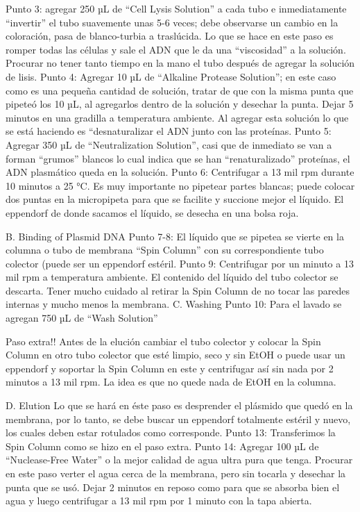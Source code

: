 \begin{appendix}
\begin{itemize}
Punto 3: agregar 250 µL de “Cell Lysis Solution” a cada tubo e inmediatamente “invertir” el tubo suavemente unas 5-6 veces; debe observarse un cambio en la coloración, pasa de blanco-turbia a traslúcida. Lo que se hace en este paso es romper todas las células y sale el ADN que le da una “viscosidad” a la solución. Procurar no tener tanto tiempo en la mano el tubo después de agregar la solución de lisis.
Punto 4: Agregar 10 µL de “Alkaline Protease Solution”; en este caso como es una pequeña cantidad de solución, tratar de que con la misma punta que pipeteó los 10 µL, al agregarlos dentro de la solución y desechar la punta. Dejar 5 minutos en una gradilla a temperatura ambiente. Al agregar esta solución lo que se está haciendo es “desnaturalizar el ADN junto con las proteínas.
Punto 5: Agregar 350 µL de “Neutralization Solution”, casi que de inmediato se van a forman “grumos” blancos lo cual indica que se han “renaturalizado” proteínas, el ADN plasmático queda en la solución. 
Punto 6: Centrifugar a 13 mil rpm durante 10 minutos a 25 °C. 
Es muy importante no pipetear partes blancas; puede colocar dos puntas en la micropipeta para que se facilite y succione mejor el líquido. El eppendorf de donde sacamos el líquido, se desecha en una bolsa roja. 

    B. Binding of Plasmid DNA
Punto 7-8: El líquido que se pipetea se vierte en la columna o tubo de membrana “Spin Column” con su correspondiente tubo colector (puede ser un eppendorf estéril.
Punto 9: Centrifugar por un minuto a 13 mil rpm a temperatura ambiente. El contenido del líquido del tubo colector se descarta. Tener mucho cuidado al retirar la Spin Column de no tocar las paredes internas y mucho menos la membrana.
    C. Washing
Punto 10: Para el lavado se agregan 750 µL de “Wash Solution” 

Paso extra!!
Antes de la elución cambiar el tubo colector y colocar la Spin Column en otro tubo colector que esté limpio, seco y sin EtOH o puede usar un eppendorf y soportar la Spin Column en este y centrifugar así sin nada por 2 minutos a 13 mil rpm. La idea es que no quede nada de EtOH en la columna.

    D. Elution
Lo que se hará en éste paso es desprender el plásmido que quedó en la membrana, por lo tanto, se debe buscar un eppendorf totalmente estéril y nuevo, los cuales deben estar rotulados como corresponde. 
Punto 13: Transferimos la Spin Column como se hizo en el paso extra.
Punto 14: Agregar 100 µL de “Nuclease-Free Water” o la mejor calidad de agua ultra pura que tenga. Procurar en este paso verter el agua cerca de la membrana, pero sin tocarla y desechar la punta que se usó. Dejar 2 minutos en reposo como para que se absorba bien el agua y luego centrifugar a 13 mil rpm por 1 minuto con la tapa abierta.



\end{itemize}
\end{appendix}
